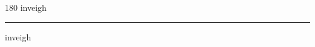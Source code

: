 
\begin{frame}
\begin{center}
\begin{turn}{180}
{\fontsize{2.5cm}{1em}\selectfont inveigh}
\end{turn}
\vspace{1em}\par  
\hrule
\vspace{1em}\par  
{\fontsize{2.5cm}{1em}\selectfont inveigh}
\end{center}
\end{frame}
